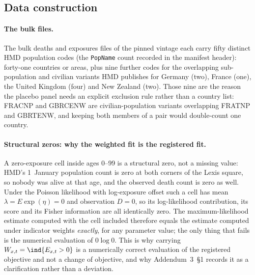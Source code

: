 \subsection{Data construction}
\label{supp:methods-data}

\paragraph{The bulk files.} The bulk deaths and exposures files of the pinned
vintage each carry fifty distinct HMD population codes (the
\texttt{PopName} count recorded in the manifest header): forty-one countries
or areas, plus nine further codes for the overlapping sub-population and
civilian variants HMD publishes for Germany (two), France (one), the United
Kingdom (four) and New Zealand (two). Those nine are the reason the placebo
panel needs an explicit exclusion rule rather than a country list: FRACNP and
GBRCENW are civilian-population variants overlapping FRATNP and GBRTENW, and
keeping both members of a pair would double-count one country.

\paragraph{Structural zeros: why the weighted fit is the registered fit.}
\label{supp:methods-zeros}
A zero-exposure cell inside ages 0--99 is a structural zero, not a missing
value: HMD's 1~January population count is zero at both corners of the Lexis
square, so nobody was alive at that age, and the observed death count is zero
as well. Under the Poisson likelihood with log-exposure offset such a cell has
mean $\lambda = E\exp(\eta) = 0$ and observation $D=0$, so its log-likelihood
contribution, its score and its Fisher information are all identically zero.
The maximum-likelihood estimate computed with the cell included therefore
equals the estimate computed under indicator weights \emph{exactly}, for any
parameter value; the only thing that fails is the numerical evaluation of
$0\log 0$. This is why carrying $W_{x,t}=\ind\{E_{x,t}>0\}$ is a numerically
correct evaluation of the registered objective and not a change of objective,
and why Addendum~3~\S1 records it as a clarification rather than a deviation.

